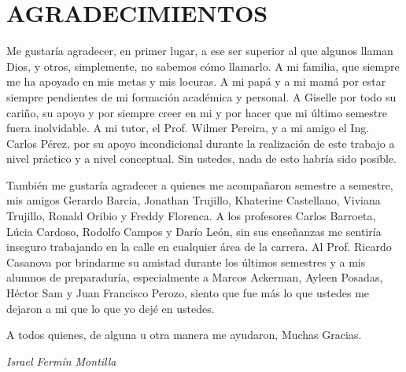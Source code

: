 \chapter*{AGRADECIMIENTOS}

Me gustaría agradecer, en primer lugar, a ese ser superior al que algunos llaman Dios, y otros, simplemente, no sabemos cómo llamarlo. A mi familia, que siempre me ha apoyado en mis metas y mis locuras. A mi papá y a mi mamá por estar siempre pendientes de mi formación académica y personal. A Giselle por todo su cariño, su apoyo y por siempre creer en mi y por hacer que mi último semestre fuera inolvidable. A mi tutor, el Prof. Wilmer Pereira, y a mi amigo el Ing. Carlos Pérez, por su apoyo incondicional durante la realización de este trabajo a nivel práctico y a nivel conceptual. Sin ustedes, nada de esto habría sido posible.

También me gustaría agradecer a quienes me acompañaron semestre a semestre, mis amigos Gerardo Barcia, Jonathan Trujillo, Khaterine Castellano, Viviana Trujillo, Ronald Oribio y Freddy Florenca. A los profesores Carlos Barroeta, Lúcia Cardoso, Rodolfo Campos y Darío León, sin sus enseñanzas me sentiría inseguro trabajando en la calle en cualquier área de la carrera. Al Prof. Ricardo Casanova por brindarme su amistad durante los últimos semestres y a mis alumnos de preparaduría, especialmente a Marcos Ackerman, Ayleen Posadas, Héctor Sam y Juan Francisco Perozo, siento que fue más lo que ustedes me dejaron a mi que lo que yo dejé en ustedes.

A todos quienes, de alguna u otra manera me ayudaron,
Muchas Gracias.


\begin{flushright}
\textit{Israel Fermín Montilla}
\end{flushright}

